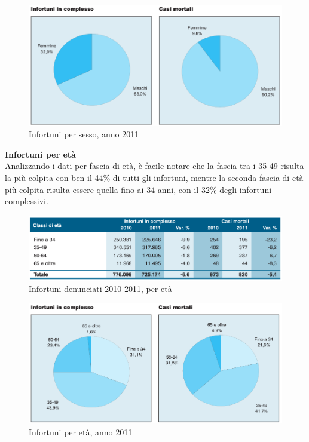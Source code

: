 \begin{figure}[H]
\centering
\includegraphics[scale=0.5]{images/analisiDiMercato/infortuniPerSesso2}
\caption{Infortuni per sesso, anno 2011}
\end{figure}

\textbf{Infortuni per età}\\
Analizzando i dati per fascia di età, è facile notare che la fascia tra i 35-49 risulta la più colpita con ben il 44\% di tutti gli infortuni, mentre la seconda fascia di età più colpita risulta essere quella fino ai 34 anni, con il 32\% degli infortuni complessivi.

\begin{figure}[H]
\centering
\includegraphics[scale=0.5]{images/analisiDiMercato/infortuniPerEta1}
\caption{Infortuni denunciati 2010-2011, per età}
\end{figure}

\begin{figure}[H]
\centering
\includegraphics[scale=0.53]{images/analisiDiMercato/infortuniPerEta2}
\caption{Infortuni per età, anno 2011}
\end{figure}








